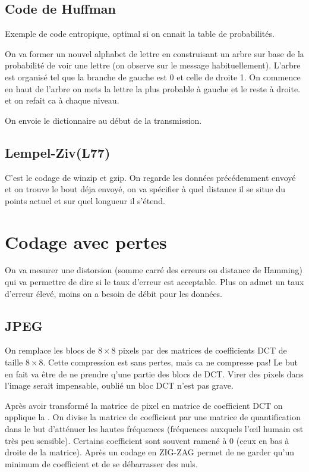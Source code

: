 \subsection{Code de Huffman}

Exemple de code entropique, optimal si on cnnait la table de probabilités.

On va former un nouvel alphabet de lettre en construisant un arbre sur base de la probabilité de voir une lettre (on observe sur le message habituellement). L'arbre est organisé tel que la branche de gauche est 0 et celle de droite 1. On commence en haut de l'arbre on mets la lettre la plus probable à gauche et le reste à droite. et on refait ca à chaque niveau.

On envoie le dictionnaire au début de la transmission.

\subsection{Lempel-Ziv(L77)}

C'est le codage de winzip et gzip. On regarde les données précédemment envoyé et on trouve le bout déja envoyé, on va spécifier à quel distance il se situe du points actuel et sur quel longueur il s'étend.

\section{Codage avec pertes}

On va mesurer une distorsion (somme carré des erreurs ou distance de Hamming) qui va permettre de dire si le taux d'erreur est acceptable. Plus on admet un taux d'erreur élevé, moins on a besoin de débit pour les données.

\subsection{JPEG}

On remplace les blocs de $8 \times 8$ pixels par des matrices de coefficients DCT de taille $8 \times 8$. Cette compression est sans pertes, mais ca ne compresse pas! Le but en fait va être de ne prendre q'une partie des blocs de DCT. Virer des pixels dans l'image serait impensable, oublié un bloc DCT n'est pas grave.

Après avoir transformé la matrice de pixel en matrice de coefficient DCT on applique la . On divise la matrice de coefficient par une matrice de quantification dans le but d’atténuer les hautes fréquences (fréquences auxquels l’œil humain est très peu sensible). Certains coefficient sont souvent ramené à 0 (ceux en bas à droite de la matrice). Après un codage en ZIG-ZAG permet de ne garder qu'un minimum de coefficient et de se débarrasser des nuls.

